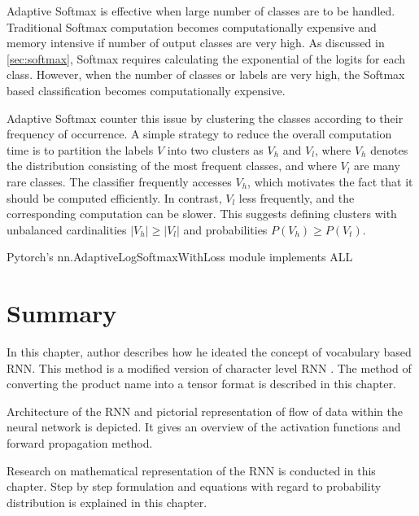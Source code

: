 Adaptive Softmax \parencite{Grave.14092016} is effective when large number of classes are to be handled. Traditional Softmax computation becomes computationally expensive and memory intensive if number of output classes are very high. As discussed in  \ref{sec:softmax}, Softmax requires calculating the exponential of the logits for each class. However, when the number of classes or labels are very high, the Softmax based classification becomes computationally expensive.



Adaptive Softmax counter this issue by clustering the classes according to their frequency of occurrence. A simple strategy to reduce the overall computation time is to partition the labels \(V\) into two clusters as \(V_h\) and \(V_l\), where \(V_h\) denotes the distribution consisting of the most frequent classes, and where \(V_l\) are many rare classes. The classifier frequently accesses \(V_h\), which motivates the fact that it should be computed efficiently. In contrast,  \(V_l\) less frequently, and the corresponding computation can be slower. This suggests defining clusters with unbalanced cardinalities \(|V_h| \geq |V_l|\) and probabilities \(P(V_h) \geq P(V_t)\).

Pytorch's \parencite{Paszke.03122019} nn.AdaptiveLogSoftmaxWithLoss module implements \acf{ALL}


\section{Summary}

In this chapter, author describes how he ideated the concept of vocabulary based RNN. This method is a modified version of character level RNN \parencite{sean}. The method of converting the product name into a tensor format is described in this chapter. 

Architecture of the RNN and pictorial representation of flow of data within the neural network is depicted. It gives an overview of the activation functions and forward propagation method. 

Research on mathematical representation of the RNN  is conducted in this chapter. Step by step formulation and equations with regard to probability distribution is explained in this chapter.